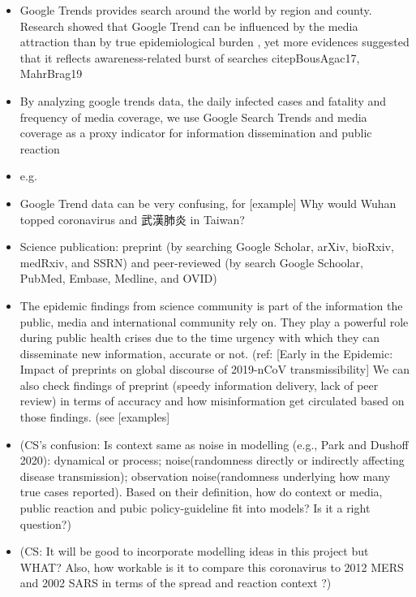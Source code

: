 \begin{itemize}
\item{Google Trends provides search around the world by region and county.  Research showed that Google Trend can be influenced by the media attraction than by true epidemiological burden \citep{}, yet more evidences suggested that it reflects awareness-related burst of searches citep{BousAgac17, MahrBrag19}}
\item{By analyzing google trends data, the daily infected cases and fatality and frequency of media coverage,  we use Google Search Trends and media coverage as a proxy indicator for information dissemination and public reaction  
}
\item{e.g. 
}
\item{Google Trend data can be very confusing, for [example]
Why would Wuhan topped coronavirus and 武漢肺炎 in Taiwan?
}
\end{itemize}

\begin{itemize}
\item{Science publication: preprint (by searching Google Scholar, arXiv, bioRxiv, medRxiv, and SSRN) and peer-reviewed (by search Google Schoolar, PubMed, Embase, Medline, and OVID)}
\item{The epidemic findings from science community is part of the information the public, media and international community rely on. They play a powerful role during public health crises due to the time urgency with which they can disseminate new information, accurate or not. (ref: [Early in the Epidemic: Impact of preprints on global discourse of 2019-nCoV transmissibility]
We can also check findings of preprint (speedy information delivery, lack of peer review) in terms of accuracy and how misinformation get circulated based on those findings. (see [examples]
}
\item{(CS’s confusion: Is context same as noise in modelling (e.g., Park and Dushoff 2020):  dynamical or process; noise(randomness directly or indirectly affecting disease transmission); observation noise(randomness underlying how many true cases reported).  Based on their definition, how do context or media, public reaction and pubic policy-guideline fit into models?  Is it a right question?)
}
\item{(CS: It will be good to incorporate modelling ideas in this project but WHAT?  Also, how workable is it to compare this coronavirus to 2012 MERS and 2002 SARS in terms of the spread and reaction context ?)
}
\end{itemize}


